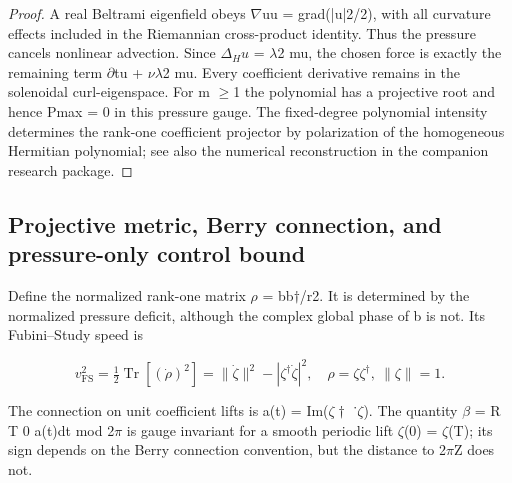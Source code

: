 \documentclass[10pt,letterpaper]{article}
\theoremstyle{remark}
\begin{document}
\begin{proof}
A real Beltrami eigenfield obeys \(\nabla \)uu = grad(|u|2/2), with all curvature effects included in the Riemannian cross-product identity. Thus the pressure cancels nonlinear advection. Since \(\Delta_H u\) = \(\lambda \)2 mu, the chosen force is exactly the remaining term \(\partial \)tu + \(\nu \lambda \)2 mu. Every coefficient derivative remains in the solenoidal curl-eigenspace. For m \(\ge \)1 the polynomial has a projective root and hence Pmax = 0 in this pressure gauge. The fixed-degree polynomial intensity determines the rank-one coefficient projector by polarization of the homogeneous Hermitian polynomial; see also the numerical reconstruction in the companion research package.

\end{proof}

\subsection{Projective metric, Berry connection, and pressure-only control bound}

Define the normalized rank-one matrix \(\rho \) = bb\(\dagger \)/r2. It is determined by the normalized pressure deficit, although the complex global phase of b is not. Its Fubini–Study speed is



\begin{equation}
\tag{24}\label{eq:24}
v_{\mathrm{FS}}^2=\tfrac12\operatorname{Tr}[(\dot\rho)^2]=\|\dot\zeta\|^2-|\zeta^\dagger\dot\zeta|^2,\quad\rho=\zeta\zeta^\dagger,\ \|\zeta\|=1.
\end{equation}

The connection on unit coefficient lifts is a(t) = Im(\(\zeta \dagger \) ˙\(\zeta \)). The quantity \(\beta \) = R T 0 a(t)dt mod 2\(\pi \) is gauge invariant for a smooth periodic lift \(\zeta \)(0) = \(\zeta \)(T); its sign depends on the Berry connection convention, but the distance to 2\(\pi \)Z does not.
\end{document}
